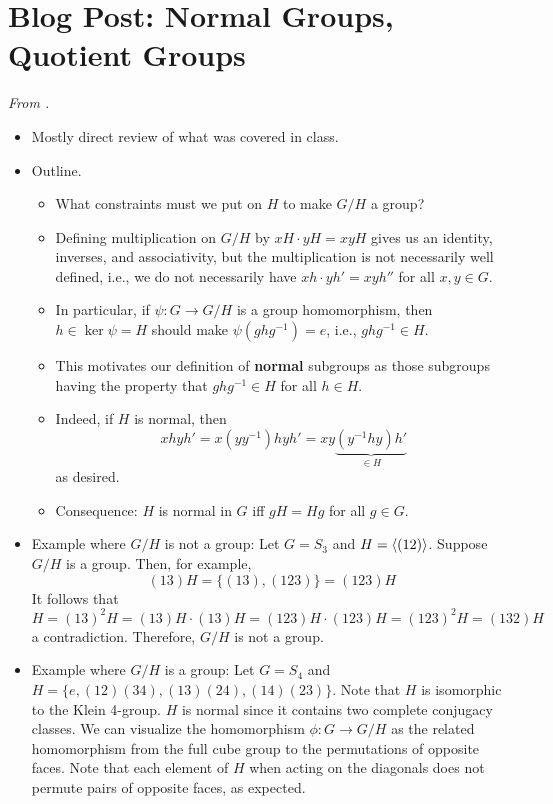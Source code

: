 \documentclass[../notes.tex]{subfiles}
\begin{document}
\section{Blog Post: Normal Groups, Quotient Groups}
\emph{From \textcite{bib:Calegari}.}
\begin{itemize}
    \item {}Mostly direct review of what was covered in class.
    \item Outline.
    \begin{itemize}
        \item What constraints must we put on $H$ to make $G/H$ a group?
        \item Defining multiplication on $G/H$ by $xH\cdot yH=xyH$ gives us an identity, inverses, and associativity, but the multiplication is not necessarily well defined, i.e., we do not necessarily have $xh\cdot yh'=xyh''$ for all $x,y\in G$.
        \item In particular, if $\psi:G\to G/H$ is a group homomorphism, then $h\in\ker\psi=H$ should make $\psi(ghg^{-1})=e$, i.e., $ghg^{-1}\in H$.
        \item This motivates our definition of \textbf{normal} subgroups as those subgroups having the property that $ghg^{-1}\in H$ for all $h\in H$.
        \item Indeed, if $H$ is normal, then
        \begin{equation*}
            xhyh' = x(yy^{-1})hyh'
            = xy\underbrace{(y^{-1}hy)h'}_{\in H}
        \end{equation*}
        as desired.
        \item Consequence: $H$ is normal in $G$ iff $gH=Hg$ for all $g\in G$.
    \end{itemize}
    \item Example where $G/H$ is not a group: Let $G=S_3$ and $H=\left\langle{(12)}\right\rangle$. Suppose $G/H$ is a group. Then, for example,
    \begin{equation*}
        (13)H = \{(13),(123)\}
        = (123)H
    \end{equation*}
    It follows that
    \begin{equation*}
        H = (13)^2H
        = (13)H\cdot(13)H
        = (123)H\cdot(123)H
        = (123)^2H
        = (132)H
    \end{equation*}
    a contradiction. Therefore, $G/H$ is not a group.
    \item Example where $G/H$ is a group: Let $G=S_4$ and $H=\{e,(12)(34),(13)(24),(14)(23)\}$. Note that $H$ is isomorphic to the Klein 4-group. $H$ is normal since it contains two complete conjugacy classes. We can visualize the homomorphism $\phi:G\to G/H$ as the related homomorphism from the full cube group to the permutations of opposite faces. Note that each element of $H$ when acting on the diagonals does not permute pairs of opposite faces, as expected.
\end{itemize}
\end{document}
